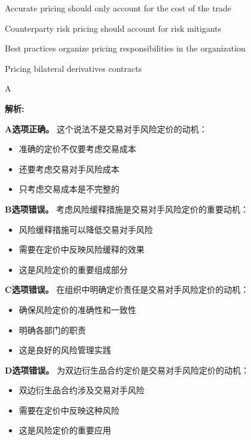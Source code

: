 \documentclass{article}
\newenvironment{explanation}
{\textbf{解析:}\par}
{\par}
\begin{document}
\begin{choices}
    \item Accurate pricing should only account for the cost of the trade
    \item Counterparty risk pricing should account for risk mitigants
    \item Best practices organize pricing responsibilities in the organization
    \item Pricing bilateral derivatives contracts
\end{choices}

\begin{correctanswer}
    A
\end{correctanswer}

\begin{explanation}
    \textbf{A选项正确。}
    这个说法不是交易对手风险定价的动机：
    \begin{itemize}
        \item 准确的定价不仅要考虑交易成本
        \item 还要考虑交易对手风险成本
        \item 只考虑交易成本是不完整的
    \end{itemize}

    \textbf{B选项错误。}
    考虑风险缓释措施是交易对手风险定价的重要动机：
    \begin{itemize}
        \item 风险缓释措施可以降低交易对手风险
        \item 需要在定价中反映风险缓释的效果
        \item 这是风险定价的重要组成部分
    \end{itemize}

    \textbf{C选项错误。}
    在组织中明确定价责任是交易对手风险定价的动机：
    \begin{itemize}
        \item 确保风险定价的准确性和一致性
        \item 明确各部门的职责
        \item 这是良好的风险管理实践
    \end{itemize}

    \textbf{D选项错误。}
    为双边衍生品合约定价是交易对手风险定价的动机：
    \begin{itemize}
        \item 双边衍生品合约涉及交易对手风险
        \item 需要在定价中反映这种风险
        \item 这是风险定价的重要应用
    \end{itemize}
\end{explanation}
\end{document}
